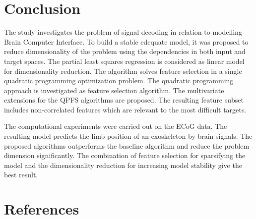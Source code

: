 \documentclass[12pt,oneside]{article}
\theoremstyle{definition}
\begin{document}
\newpage
\section{Conclusion}
The study investigates the problem of signal decoding in relation to modelling Brain Computer Interface. 
To build a stable edequate model, it was proposed to reduce dimensionality of the problem using the dependencies in both input and target spaces.
The partial least squares regression is considered as linear model for dimensionality reduction.
The algorithm solves feature selection in a single quadratic programming optimization problem.
The quadratic programming approach is investigated as feature selection algorithm.
The multivariate extensions for the QPFS algorithms are proposed.
The resulting feature subset includes non-correlated features which are relevant to the most difficult targets.

The computational experiments were carried out on the ECoG data. 
The resulting model predicts the limb position of an exoskeleton by brain signals.
The proposed algorithms outperforms the baseline algorithm and reduce the problem dimension significantly.
The combination of feature selection for sparsifying the model and the dimensionality reduction for increasing model stability give the best result.
\newpage
\thispagestyle{empty}
\section*{References}
\begingroup
\renewcommand{\section}[2]{}


\endgroup
\end{document}
